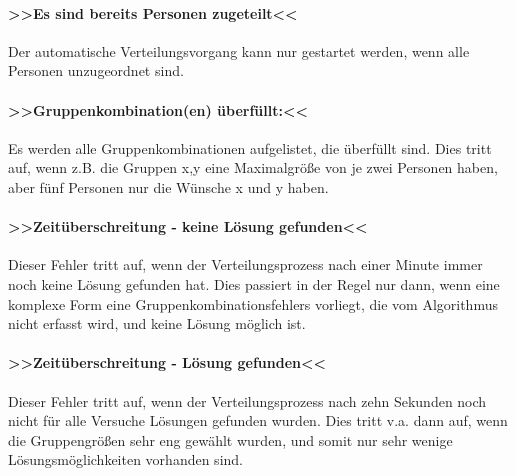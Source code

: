 \paragraph{>>Es sind bereits Personen zugeteilt<<} Der automatische Verteilungsvorgang kann nur gestartet werden, wenn alle Personen unzugeordnet sind.

\paragraph{>>Gruppenkombination(en) überfüllt:<<} Es werden alle Gruppenkombinationen aufgelistet, die überfüllt sind. Dies tritt auf, wenn z.B. die Gruppen x,y eine Maximalgröße von je zwei Personen haben, aber fünf Personen nur die Wünsche x und y haben.

\paragraph{>>Zeitüberschreitung - keine Lösung gefunden<<} Dieser Fehler tritt auf, wenn der Verteilungsprozess nach einer Minute immer noch keine Lösung gefunden hat. Dies passiert in der Regel nur dann, wenn eine komplexe Form eine Gruppenkombinationsfehlers vorliegt, die vom Algorithmus nicht erfasst wird, und keine Lösung möglich ist.

\paragraph{>>Zeitüberschreitung - Lösung gefunden<<} Dieser Fehler tritt auf, wenn der Verteilungsprozess nach zehn Sekunden noch nicht für alle Versuche Lösungen gefunden wurden. Dies tritt v.a. dann auf, wenn die Gruppengrößen sehr eng gewählt wurden, und somit nur sehr wenige Lösungsmöglichkeiten vorhanden sind.
